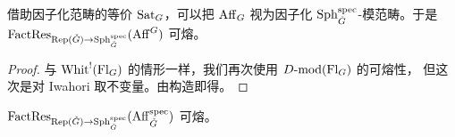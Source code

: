 \begin{proposition}\label{prop:3.3.1.6}
借助因子化范畴的等价 $\mathrm{Sat}_G$，可以把 $\mathrm{Aff}_G$ 视为因子化
$\mathrm{Sph}^{\mathrm{spec}}_{\check G}$-模范畴。于是
$\mathrm{FactRes}_{\mathrm{Rep}(\check G)\to \mathrm{Sph}^{\mathrm{spec}}_{\check G}}(\mathrm{Aff}^G)$ 可熔。
\end{proposition}

\begin{proof}
与 $\mathrm{Whit}^{!}(\mathrm{Fl}_G)$ 的情形一样，我们再次使用 $D\text{-}\mathrm{mod}(\mathrm{Fl}_G)$ 的可熔性，
但这次是对 Iwahori 取不变量。由构造即得。
\end{proof}

\begin{proposition}\label{prop:3.3.1.7}
$\mathrm{FactRes}_{\mathrm{Rep}(\check G)\to \mathrm{Sph}^{\mathrm{spec}}_{\check G}}
(\mathrm{Aff}^{\mathrm{spec}}_{\check G})$ 可熔。
\end{proposition}
